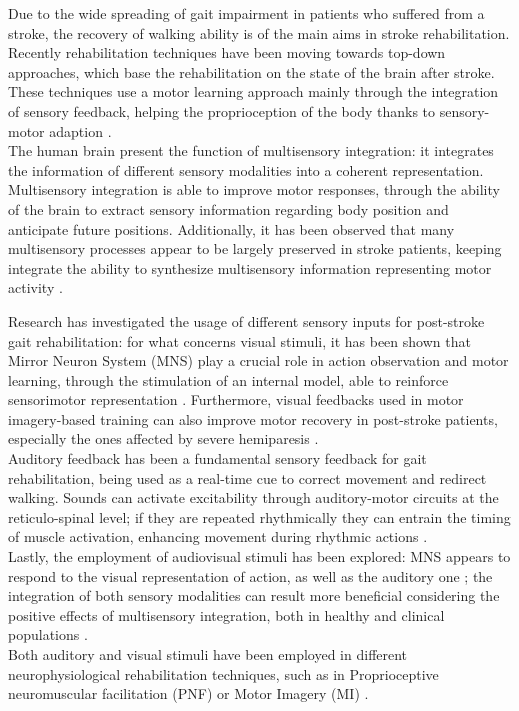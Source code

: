 Due to the wide spreading of gait impairment in patients who suffered from a stroke, the recovery of walking ability is of the main aims in stroke rehabilitation. Recently rehabilitation techniques have been moving towards top-down approaches, which base the rehabilitation on the state of the brain after stroke. These techniques use a motor learning approach mainly through the integration of sensory feedback, helping the proprioception of the body thanks to sensory-motor adaption \parencite{Belda-Lois_2011}. \\
The human brain present the function of multisensory integration: it integrates the information of different sensory modalities into a coherent representation. Multisensory integration is able to improve motor responses, through the ability of the brain to extract sensory information regarding body position and anticipate future positions. Additionally, it has been observed that many multisensory processes appear to be largely preserved in stroke patients, keeping integrate the ability to synthesize multisensory information representing motor activity \parencite{Bolognini_2013}.

Research has investigated the usage of different sensory inputs for post-stroke gait rehabilitation: for what concerns visual stimuli, it has been shown that Mirror Neuron System (MNS) play a crucial role in action observation and motor learning, through the stimulation of an internal model, able to reinforce sensorimotor representation \parencite{Rizzolati_2004}. Furthermore, visual feedbacks used in motor imagery-based training can also improve motor recovery in post-stroke patients, especially the ones affected by severe hemiparesis \parencite{Mihara_2013}. \\
Auditory feedback has been a fundamental sensory feedback for gait rehabilitation, being used as a real-time cue to correct movement and redirect walking. Sounds can activate excitability through auditory-motor circuits at the reticulo-spinal level; if they are repeated rhythmically they can entrain the timing of muscle activation, enhancing movement during rhythmic actions \parencite{Thaut_1999}. \\
Lastly, the employment of audiovisual stimuli has been explored: MNS appears to respond to the visual representation of action, as well as the auditory one \parencite{Rizzolati_2004}; the integration of both sensory modalities can result more beneficial considering the positive effects of multisensory integration, both in healthy and clinical populations \parencite{Bolognini_2015}. \\
Both auditory and visual stimuli have been employed in different neurophysiological rehabilitation techniques, such as in Proprioceptive neuromuscular facilitation (PNF) \parencite{Moros_2000} or Motor Imagery (MI) \parencite{Mason_2007}. 


